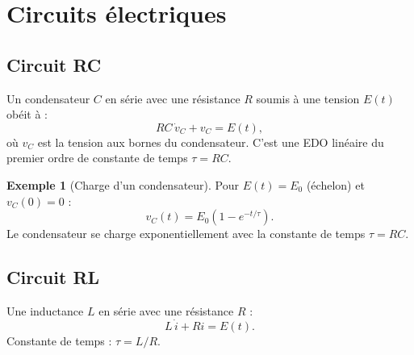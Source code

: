 \documentclass[12pt,a4paper,openany]{book}
\theoremstyle{definition}
\newtheorem{exemple}[definition]{Exemple}
\theoremstyle{plain}
\theoremstyle{remark}
\begin{document}
\begin{center}
\end{center}

\section{Circuits électriques}
\label{sec:circuits}

\subsection{Circuit RC}
\label{subsec:circuit-RC}

Un condensateur $C$ en série avec une résistance $R$ soumis à une
tension $E(t)$ obéit à :
\begin{equation}
\label{eq:RC}
RC\,\dot{v}_C + v_C = E(t),
\end{equation}
où $v_C$ est la tension aux bornes du condensateur. C'est une EDO
linéaire du premier ordre de constante de temps $\tau = RC$.

\begin{exemple}[Charge d'un condensateur]
\label{ex:charge-RC}
Pour $E(t) = E_0$ (échelon) et $v_C(0) = 0$ :
\[
v_C(t) = E_0(1 - e^{-t/\tau}).
\]
Le condensateur se charge exponentiellement avec la constante de
temps $\tau = RC$.
\end{exemple}

\subsection{Circuit RL}
\label{subsec:circuit-RL}

Une inductance $L$ en série avec une résistance $R$ :
\begin{equation}
\label{eq:RL}
L\,\dot{i} + Ri = E(t).
\end{equation}
Constante de temps : $\tau = L/R$.
\end{document}
